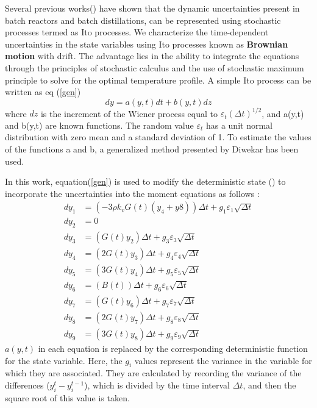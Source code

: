 \documentclass[3p,times]{elsarticle}
\begin{document}
Several previous works(\cite{diwekar}) have shown that the dynamic uncertainties present in batch reactors\cite{benavides2} and batch distillations\cite{diwekar}, can be represented using stochastic processes termed as Ito processes. We characterize the time-dependent uncertainties in the state variables using Ito processes known as \textbf{Brownian motion} with drift\cite{diwekar,wong}. The advantage lies in the ability to integrate the equations through the principles of stochastic calculus and the use of stochastic maximum principle to solve for the optimal temperature profile. 
A simple Ito process can be written as eq (\ref{gen})
\begin{equation} \label{gen}
dy = a(y,t)dt + b(y,t)dz
\end{equation}
where $dz$ is the increment of the Wiener process equal to $\varepsilon_{t}(\Delta t)^{1/2}$, and a(y,t) and b(y,t) are known functions. The random value $\varepsilon_{t}$ has a unit normal distribution with zero mean and a standard deviation of 1. To estimate the values of the functions a and b, a generalized method presented by Diwekar\cite{diwekar} has been used.\par
In this work, equation(\ref{gen}) is used to modify the deterministic state () to incorporate the uncertainties into the moment equations as follows :
\begin{align}
dy_{1} &= \left(-3\rho k_{v}G(t)(y_{4}+y{8})\right)\Delta t + g_{1}\varepsilon_{1}\sqrt{\Delta t} \label{steq1}\\
dy_{2} &= 0 \\
dy_{3} &= (G(t)y_{2})\Delta t +g_{3}\varepsilon_{3}\sqrt{\Delta t} \\
dy_{4} &= (2G(t)y_{3})\Delta t + g_{4}\varepsilon_{4}\sqrt{\Delta t} \\
dy_{5} &= (3G(t)y_{4})\Delta t + g_{5}\varepsilon_{5}\sqrt{\Delta t} \\
dy_{6} &= (B(t))\Delta t + g_{6}\varepsilon_{6}\sqrt{\Delta t} \\
dy_{7} &= (G(t)y_{6})\Delta t + g_{7}\varepsilon_{7}\sqrt{\Delta t} \\
dy_{8} &= (2G(t)y_{7})\Delta t +g_{8}\varepsilon_{8}\sqrt{\Delta t} \\
dy_{9} &= (3G(t)y_{8})\Delta t + g_{9}\varepsilon_{9}\sqrt{\Delta t} \label{steq2} 
\end{align}
$a(y,t)$ in each equation is replaced by the corresponding deterministic function for the state variable. Here, the $g_{i}$ values represent the variance in the variable for which they are associated. They are calculated by recording the variance of the differences ($y_{i}^{t} - y_{i}^{t-1}$), which is divided by the time interval $\Delta t$, and then the square root of this value is taken. \par
\end{document}
